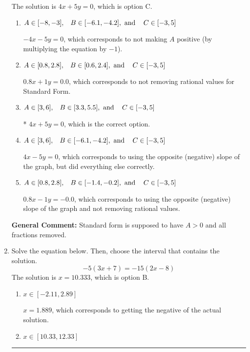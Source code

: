 \documentclass{extbook}[14pt]
\newcommand{\litem}[1]{\item #1

\rule{\textwidth}{0.4pt}}
\begin{document}
\begin{enumerate}
{The solution is \( 4x + 5y = 0 \), which is option C.\begin{enumerate}[label=\Alph*.]
\item \( A \in [-8, -3], \hspace{3mm} B \in [-6.1, -4.2], \text{ and } \hspace{3mm} C \in [-3, 5] \)

 $-4x - 5y = 0$, which corresponds to not making $A$ positive (by multiplying the equation by $-1$).
\item \( A \in [0.8, 2.8], \hspace{3mm} B \in [0.6, 2.4], \text{ and } \hspace{3mm} C \in [-3, 5] \)

 $0.8x + 1y = 0.0$, which corresponds to not removing rational values for Standard Form.
\item \( A \in [3, 6], \hspace{3mm} B \in [3.3, 5.5], \text{ and } \hspace{3mm} C \in [-3, 5] \)

* $4x + 5y = 0$, which is the correct option.
\item \( A \in [3, 6], \hspace{3mm} B \in [-6.1, -4.2], \text{ and } \hspace{3mm} C \in [-3, 5] \)

 $4x - 5y = 0$, which corresponds to using the opposite (negative) slope of the graph, but did everything else correctly.
\item \( A \in [0.8, 2.8], \hspace{3mm} B \in [-1.4, -0.2], \text{ and } \hspace{3mm} C \in [-3, 5] \)

 $0.8x - 1y = -0.0$, which corresponds to using the opposite (negative) slope of the graph and not removing rational values.
\end{enumerate}

\textbf{General Comment:} Standard form is supposed to have $A > 0$ and all fractions removed.
}
\litem{
Solve the equation below. Then, choose the interval that contains the solution.
\[ -5(3x + 7) = -15(2x -8) \]The solution is \( x = 10.333 \), which is option B.\begin{enumerate}[label=\Alph*.]
\item \( x \in [-2.11, 2.89] \)

$x = 1.889$, which corresponds to getting the negative of the actual solution.
\item \( x \in [10.33, 12.33] \)


\end{enumerate}}
\end{enumerate}
\end{document}
